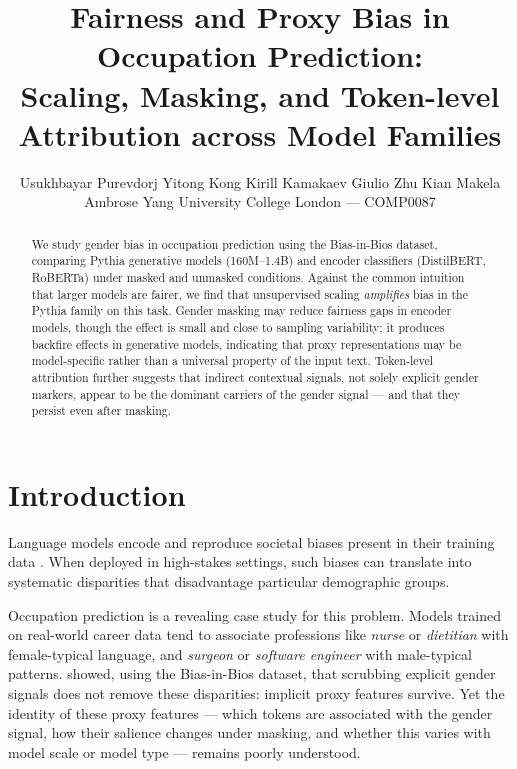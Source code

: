 \documentclass[11pt]{article}
\title{\textbf{Fairness and Proxy Bias in Occupation Prediction:}\\
Scaling, Masking, and Token-level Attribution across Model Families}
\author{Usukhbayar Purevdorj \And Yitong Kong \And Kirill Kamakaev
\AND Giulio Zhu \And Kian Makela \And Ambrose Yang
\AND University College London --- COMP0087}
\date{}
\begin{document}
\maketitle

\begin{abstract}
We study gender bias in occupation prediction using the Bias-in-Bios
dataset, comparing Pythia generative models (160M--1.4B) and encoder
classifiers (DistilBERT, RoBERTa) under masked and unmasked conditions.
Against the common intuition that larger models are fairer, we find that
unsupervised scaling \emph{amplifies} bias in the Pythia family on this task.
Gender masking may reduce fairness gaps in encoder models, though the
effect is small and close to sampling variability; it produces backfire
effects in generative models, indicating that proxy representations may
be model-specific rather than a universal property of the input text.
Token-level attribution further suggests that indirect contextual signals,
not solely explicit gender markers, appear to be the dominant carriers of the gender
signal --- and that they persist even after masking.
\end{abstract}

\section{Introduction}

Language models encode and reproduce societal biases present in their
training data \citep{caliskan-etal-2017-bias}. When deployed in
high-stakes settings, such biases can translate into systematic
disparities that disadvantage particular demographic groups.

Occupation prediction is a revealing case study for this problem.
Models trained on real-world career data tend to associate
professions like \emph{nurse} or \emph{dietitian} with female-typical
language, and \emph{surgeon} or \emph{software engineer} with
male-typical patterns. \citet{de-arteaga-etal-2019-bias} showed, using
the Bias-in-Bios dataset, that scrubbing explicit gender signals does
not remove these disparities: implicit proxy features survive.
Yet the identity of these proxy features — which tokens are associated
with the gender signal, how their salience changes under masking, and
whether this varies with model scale or model type — remains poorly
understood.
\end{document}
